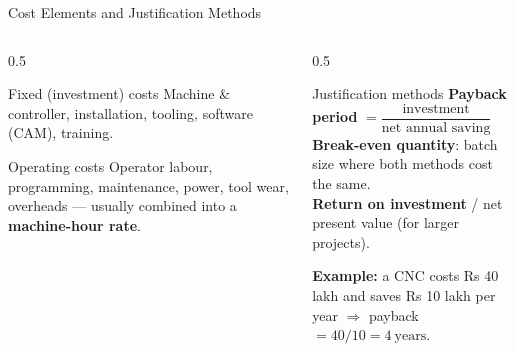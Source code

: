 \documentclass[aspectratio=169]{beamer}
\begin{document}
	\begin{frame}{Cost Elements and Justification Methods}
		\begin{columns}[T]
			\begin{column}{0.5\textwidth}
				\begin{block}{Fixed (investment) costs}
					\small Machine \& controller, installation, tooling, software (CAM), training.
				\end{block}
				\begin{block}{Operating costs}
					\small Operator labour, programming, maintenance, power, tool wear, overheads --- usually combined into a \textbf{machine-hour rate}.
				\end{block}
			\end{column}
			\begin{column}{0.5\textwidth}
				\begin{block}{Justification methods}
					\small
					\textbf{Payback period} $= \dfrac{\text{investment}}{\text{net annual saving}}$\\[4pt]
					\textbf{Break-even quantity}: batch size where both methods cost the same.\\[4pt]
					\textbf{Return on investment} / net present value (for larger projects).
				\end{block}
				\vspace{0.1cm}
				\footnotesize \textbf{Example:} a CNC costs Rs 40 lakh and saves Rs 10 lakh per year $\Rightarrow$ payback $= 40/10 = \boxed{4\ \text{years}}$.
			\end{column}
		\end{columns}
	\end{frame}
\end{document}
